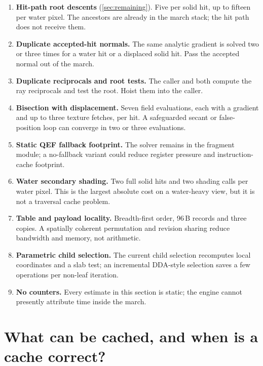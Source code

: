 \documentclass[11pt,a4paper]{article}
\newcommand{\code}[1]{\texttt{\detokenize{#1}}}
\theoremstyle{plain}
\theoremstyle{definition}
\theoremstyle{remark}
\begin{document}
\begin{enumerate}[leftmargin=1.5em,itemsep=2pt]
\item \textbf{Hit-path root descents} (\cref{sec:remaining}). Five per solid
      hit, up to fifteen per water pixel. The ancestors are already in the
      march stack; the hit path does not receive them.
\item \textbf{Duplicate accepted-hit normals.} The same analytic gradient is
      solved two or three times for a water hit or a displaced solid hit.
      Pass the accepted normal out of the march.
\item \textbf{Duplicate reciprocals and root tests.} The caller and
      \code{rmMarchRoot} both compute the ray reciprocals and test the root.
      Hoist them into the caller.
\item \textbf{Bisection with displacement.} Seven field evaluations, each with
      a gradient and up to three texture fetches, per hit. A safeguarded secant
      or false-position loop can converge in two or three evaluations.
\item \textbf{Static QEF fallback footprint.} The solver remains in the
      fragment module; a no-fallback variant could reduce register pressure and
      instruction-cache footprint.
\item \textbf{Water secondary shading.} Two full solid hits and two shading
      calls per water pixel. This is the largest absolute cost on a water-heavy
      view, but it is not a traversal cache problem.
\item \textbf{Table and payload locality.} Breadth-first order, 96\,B records
      and three copies. A spatially coherent permutation and revision sharing
      reduce bandwidth and memory, not arithmetic.
\item \textbf{Parametric child selection.} The current child selection
      recomputes local coordinates and a slab test; an incremental DDA-style
      selection saves a few operations per non-leaf iteration.
\item \textbf{No counters.} Every estimate in this section is static; the
      engine cannot presently attribute time inside the march.
\end{enumerate}

\section{What can be cached, and when is a cache correct?}
\label{sec:theory}
\end{document}
